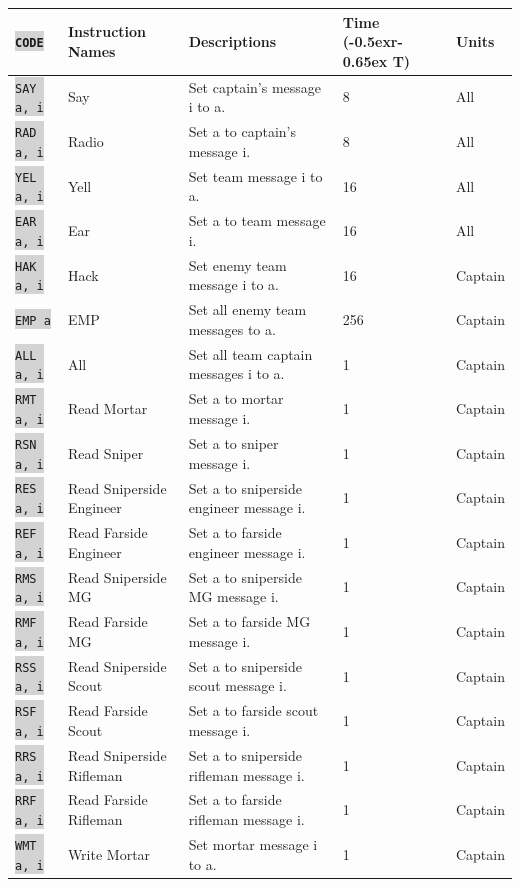 \documentclass{article}
\newcommand{\vnscode}[1]{\colorbox{lightgray}{\lstinline[language=vns]{#1}}}
\newcommand{\RT}{\lower-0.5ex\hbox{r}\kern-0.65ex T}
\begin{document}
\begin{minipage}{\textwidth}
\label{table:communication}
\centering
\begin{tabular}{lllll}
    \hline \vnscode{CODE} & Instruction Names & Descriptions & Time (\RT) & Units \\ \hline
    \vnscode{SAY a, i} & Say & Set captain's message i to a. & 8 & All \\
    \vnscode{RAD a, i} & Radio & Set a to captain's message i. & 8 & All \\
    \vnscode{YEL a, i} & Yell & Set team message i to a. & 16 & All \\
    \vnscode{EAR a, i} & Ear & Set a to team message i. & 16 & All \\
    \vnscode{HAK a, i} & Hack & Set enemy team message i to a. & 16 & Captain \\
    \vnscode{EMP a} & EMP & Set all enemy team messages to a. & 256 & Captain \\
    \vnscode{ALL a, i} & All & Set all team captain messages i to a. & 1 & Captain \\
    \vnscode{RMT a, i} & Read Mortar & Set a to mortar message i. & 1 & Captain \\
    \vnscode{RSN a, i} & Read Sniper & Set a to sniper message i. & 1 & Captain \\
    \vnscode{RES a, i} & Read Sniperside Engineer & Set a to sniperside engineer message i. & 1 & Captain \\
    \vnscode{REF a, i} & Read Farside Engineer & Set a to farside engineer message i. & 1 & Captain \\
    \vnscode{RMS a, i} & Read Sniperside MG & Set a to sniperside MG message i. & 1 & Captain \\
    \vnscode{RMF a, i} & Read Farside MG & Set a to farside MG message i. & 1 & Captain \\
    \vnscode{RSS a, i} & Read Sniperside Scout & Set a to sniperside scout message i. & 1 & Captain \\
    \vnscode{RSF a, i} & Read Farside Scout & Set a to farside scout message i. & 1 & Captain \\
    \vnscode{RRS a, i} & Read Sniperside Rifleman & Set a to sniperside rifleman message i. & 1 & Captain \\
    \vnscode{RRF a, i} & Read Farside Rifleman & Set a to farside rifleman message i. & 1 & Captain \\
    \vnscode{WMT a, i} & Write Mortar & Set mortar message i to a. & 1 & Captain \\

\end{tabular}
\end{minipage}
\end{document}
